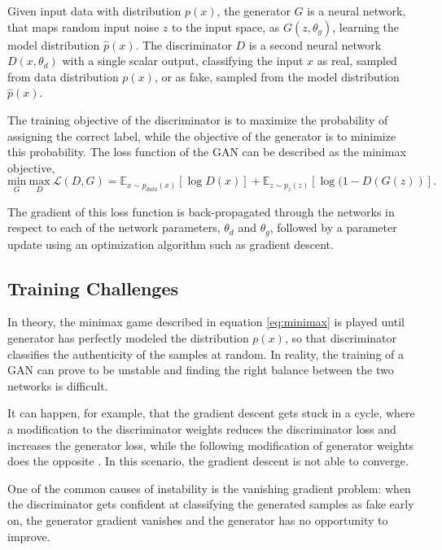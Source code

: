 \documentclass[12pt]{report}
\begin{document}
Given input data with distribution $p(x)$, the generator $G$ is a neural network, that maps random input noise $z$ to the input space, as $G(z, \theta_{g})$, learning the model distribution $\hat{p}(x)$. The discriminator $D$ is a second neural network $D(x, \theta_{d})$ with a single scalar output, classifying the input $x$ as real, sampled from data distribution $p(x)$, or as fake, sampled from the model distribution $\hat{p}(x)$. 

The training objective of the discriminator is to maximize the probability of assigning the correct label, while the objective of the generator is to minimize this probability. The loss function of the GAN can be described as the minimax objective,
\begin{equation}
\underset{G}{\mathrm{min}} \ \underset{D}{\mathrm{max}} \ \mathcal{L}(D,G) = \mathbb{E}_{x \sim p_{data}(x)}[\log D(x)] + \mathbb{E}_{z \sim p_{z}(z)}[\log (1 - D(G(z))].
\label{eq:minimax}
\end{equation}

The gradient of this loss function is back-propagated through the networks in respect to each of the network parameters, $\theta_{d}$ and $\theta_{g}$, followed by a parameter update using an optimization algorithm such as gradient descent.

\subsection{Training Challenges} \label{sec:gan_diff}

In theory, the minimax game described in equation \ref{eq:minimax} is played until generator has perfectly modeled the distribution $p(x)$, so that discriminator classifies the authenticity of the samples at random. In reality, the training of a GAN can prove to be unstable and finding the right balance between the two networks is difficult.

It can happen, for example, that the gradient descent gets stuck in a cycle, where a modification to the discriminator weights reduces the discriminator loss and increases the generator loss, while the following modification of generator weights does the opposite \cite{salimans_improved_2016}. In this scenario, the gradient descent is not able to converge.

One of the common causes of instability is the vanishing gradient problem: when the discriminator gets confident at classifying the generated samples as fake early on, the generator gradient vanishes and the generator has no opportunity to improve. 
\end{document}
